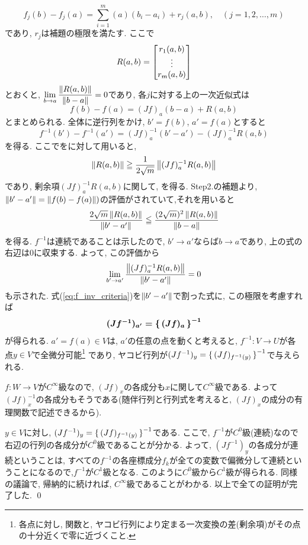 \[f_j(b) - f_j(a) = \sum_{i=1}^{m}(a)(b_i - a_i) + r_j(a,b),\quad (j=1,2,\dots,m)\]
であり, $r_j$は補題の極限を満たす. ここで
\[R(a,b) = \begin{bmatrix} r_1(a,b) \\
\vdots \\
r_m(a,b)
\end{bmatrix}\]
とおくと, $\displaystyle\lim_{b\to a} \dfrac{\left\| R(a,b) \right\|}{\left\| b-a \right\|} = 0$であり, 各$j$に対する上の一次近似式は
\[f(b) - f(a) = (Jf)_{a}(b-a) + R(a,b)\]
とまとめられる. 全体に逆行列をかけ, $b' = f(b)$, $a' = f(a)$とすると
\begin{equation} \label{eq:f_inv_criteria}
f^{-1}(b') - f^{-1}(a') = (Jf)_{a}^{-1}(b'-a') - (Jf)_{a}^{-1} R(a,b)
\end{equation}
を得る. ここでをに対して用いると,
\[\left\| R(a,b) \right\|\geqq \dfrac{1}{2\sqrt{m}} \left\| (Jf)_{a}^{-1}R(a,b) \right\|\]
であり, 剰余項$(Jf)_{a}^{-1}R(a,b)$に関して,
を得る. Step2.の補題より, $\left\| b'-a' \right\| =\left\| f(b) - f(a) \right\|)$の評価がされていて,それを用いると
\[\dfrac{2\sqrt{m}\left\| R(a,b) \right\|}{\left\| b' - a' \right\|} \leqq \dfrac{(2\sqrt{m})^2 \left\| R(a,b) \right\|}{\left\| b-a \right\|}\]
を得る. $f^{-1}$は連続であることは示したので, $b' \to a'$ならば$b\to a$であり, 上の式の右辺は$0$に収束する. よって, この評価から
\[\lim_{b' \to a'} \dfrac{\left\| (Jf)_{a}^{-1} R(a,b) \right\|}{\left\| b' - a' \right\|} = 0\]
も示された. 式(\ref{eq:f_inv_criteria})を$\left\| b'-a' \right\|$で割った式に, この極限を考慮すれば
\[{\mbox{\boldmath $(Jf^{-1})_{a'} = \set{(Jf)_{a}}^{-1}$}}\]
が得られる. $a' = f(a) \in V$は, $a'$の任意の点を動くと考えると, $f^{-1}:V\to U$が各点$y\in V$で全微分可能\footnote{各点に対し, 関数と, ヤコビ行列により定まる一次変換の差(剰余項)がその点の十分近くで零に近づくこと.} であり, ヤコビ行列が$(Jf^{-1})_{y} = \set{(Jf)_{f^{-1}(y)}}^{-1}$で与えられる. \par
$f:W\to V$が$C^{\infty}$級なので, $(Jf)_{x}$の各成分も$x$に関して$C^{\infty}$級である. よって$(Jf)_{x}^{-1}$の各成分もそうである(随伴行列と行列式を考えると, $(Jf)_{x}$の成分の有理関数で記述できるから). \par
$y\in V$に対し, $(Jf^{-1})_{y} = \set{(Jf)_{f^{-1}(y)}}^{-1}$である. ここで, $f^{-1}$が$C^0$級(連続)なので右辺の行列の各成分が$C^0$級であることが分かる. よって, $(Jf^{-1})_{y}$の各成分が連続ということは, すべての$f^{-1}$の各座標成分$f_k$が全ての変数で偏微分して連続ということになるので,$f^{-1}$が$C^1$級となる. このように$C^0$級から$C^1$級が得られる. 同様の議論で, 帰納的に続ければ, $C^{\infty}$級であることがわかる. 以上で全ての証明が完了した. \qed







